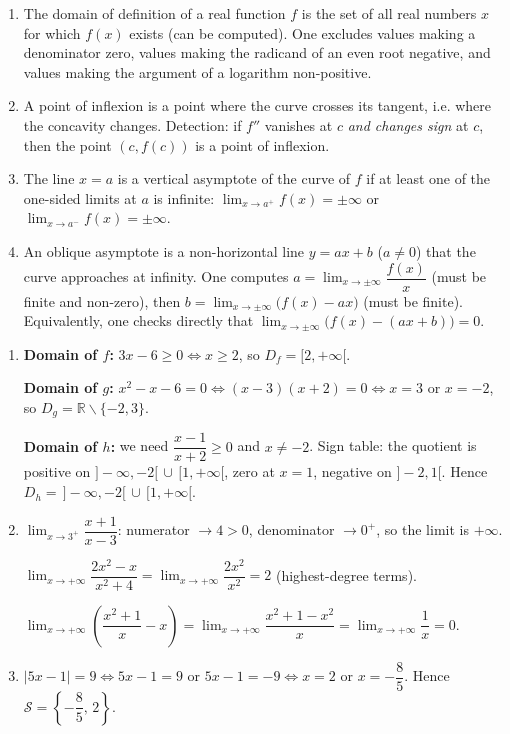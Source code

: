 \documentclass[11pt]{article}
\newcommand{\cle}[1]{{\popxbold\color{popdark}#1}}
\def\setminus{\mathbin{\backslash}}\let\smallsetminus\setminus
\begin{document}
\begin{corrige}
\begin{enumerate}
\item The \cle{domain of definition} of a real function $f$ is the set of all real numbers $x$ for which $f(x)$ exists (can be computed). One excludes values making a denominator zero, values making the radicand of an even root negative, and values making the argument of a logarithm non-positive.
\item A \cle{point of inflexion} is a point where the curve crosses its tangent, i.e. where the concavity changes. Detection: if $f''$ vanishes at $c$ \emph{and changes sign} at $c$, then the point $(c,f(c))$ is a point of inflexion.
\item The line $x=a$ is a vertical asymptote of the curve of $f$ if at least one of the one-sided limits at $a$ is infinite: $\lim_{x\to a^{+}}f(x)=\pm\infty$ or $\lim_{x\to a^{-}}f(x)=\pm\infty$.
\item An \cle{oblique asymptote} is a non-horizontal line $y=ax+b$ ($a\neq 0$) that the curve approaches at infinity. One computes $a=\lim_{x\to\pm\infty}\dfrac{f(x)}{x}$ (must be finite and non-zero), then $b=\lim_{x\to\pm\infty}\big(f(x)-ax\big)$ (must be finite). Equivalently, one checks directly that $\lim_{x\to\pm\infty}\big(f(x)-(ax+b)\big)=0$.
\end{enumerate}
\end{corrige}

\begin{corrige}
\begin{enumerate}
\item \textbf{Domain of $f$:} $3x-6\geq 0 \iff x\geq 2$, so $D_f=[2,+\infty[$.

\textbf{Domain of $g$:} $x^{2}-x-6=0 \iff (x-3)(x+2)=0 \iff x=3$ or $x=-2$, so $D_g=\mathbb{R}\setminus\{-2,3\}$.

\textbf{Domain of $h$:} we need $\dfrac{x-1}{x+2}\geq 0$ and $x\neq -2$. Sign table: the quotient is positive on $]-\infty,-2[\,\cup\,[1,+\infty[$, zero at $x=1$, negative on $]-2,1[$. Hence $D_h=\,]-\infty,-2[\,\cup\,[1,+\infty[$.

\item $\lim_{x\to 3^{+}}\dfrac{x+1}{x-3}$: numerator $\to 4>0$, denominator $\to 0^{+}$, so the limit is $+\infty$.

$\lim_{x\to+\infty}\dfrac{2x^{2}-x}{x^{2}+4}=\lim_{x\to+\infty}\dfrac{2x^{2}}{x^{2}}=2$ (highest-degree terms).

$\lim_{x\to+\infty}\left(\dfrac{x^{2}+1}{x}-x\right)=\lim_{x\to+\infty}\dfrac{x^{2}+1-x^{2}}{x}=\lim_{x\to+\infty}\dfrac{1}{x}=0$.

\item $|5x-1|=9 \iff 5x-1=9$ or $5x-1=-9 \iff x=2$ or $x=-\dfrac{8}{5}$. Hence $\mathcal{S}=\left\{-\dfrac{8}{5},\,2\right\}$.
\end{enumerate}
\end{corrige}
\end{document}
